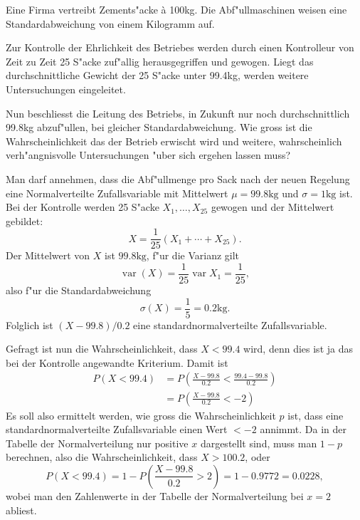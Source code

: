 Eine Firma vertreibt Zements"acke \`a 100kg. Die Abf"ullmaschinen weisen
eine Standardabweichung von einem Kilogramm auf.

Zur Kontrolle der Ehrlichkeit des Betriebes werden durch einen Kontrolleur
von Zeit zu Zeit 25 S"acke zuf"allig herausgegriffen und gewogen. Liegt
das durchschnittliche Gewicht der 25 S"acke unter 99.4kg, werden weitere
Untersuchungen eingeleitet.

Nun beschliesst die Leitung des Betriebs, in Zukunft nur noch durchschnittlich
99.8kg abzuf"ullen, bei gleicher Standardabweichung. Wie gross ist die
Wahrscheinlichkeit das der Betrieb erwischt wird und weitere, wahrscheinlich
verh"angnisvolle Untersuchungen "uber sich ergehen lassen muss?

\begin{loesung}
Man darf annehmen, dass die Abf"ullmenge pro Sack nach der neuen Regelung
eine Normalverteilte Zufallsvariable mit Mittelwert $\mu=99.8\text{kg}$ und
$\sigma=1\text{kg}$ ist. Bei der Kontrolle werden 25 S"acke $X_1,\dots,X_{25}$
gewogen und der Mittelwert gebildet:
\[
X=\frac1{25}(X_1+\cdots +X_{25}).
\]
Der Mittelwert von $X$ ist $99.8\text{kg}$, f"ur die Varianz gilt
\[
\operatorname{var}(X)=\frac1{25}\operatorname{var}{X_1}=\frac1{25},
\]
also f"ur die Standardabweichung
\[
\sigma(X)=\frac15=0.2\text{kg}.
\]
Folglich ist $(X-99.8)/0.2$ eine standardnormalverteilte Zufallsvariable.

Gefragt ist nun die Wahrscheinlichkeit, dass $X<99.4$ wird, denn dies ist ja
das bei der Kontrolle angewandte Kriterium. Damit ist
\begin{align*}
P(X<99.4)
&=P\left(\frac{X-99.8}{0.2} < \frac{99.4-99.8}{0.2}\right)\\
&=P\left(\frac{X-99.8}{0.2} < -2\right)
\end{align*}
Es soll also ermittelt werden, wie gross die Wahrscheinlichkeit $p$ ist, dass
eine standardnormalverteilte Zufallsvariable einen Wert $<-2$ annimmt.
Da in der Tabelle der Normalverteilung nur positive $x$ dargestellt sind,
muss man $1-p$ berechnen, also die Wahrscheinlichkeit, dass $X>100.2$,
oder
\[
P(X<99.4)=1-P\left(\frac{X-99.8}{0.2}>2\right)
=1-0.9772=0.0228,
\]
wobei man den Zahlenwerte in der Tabelle der Normalverteilung bei $x=2$ abliest.
\end{loesung}

